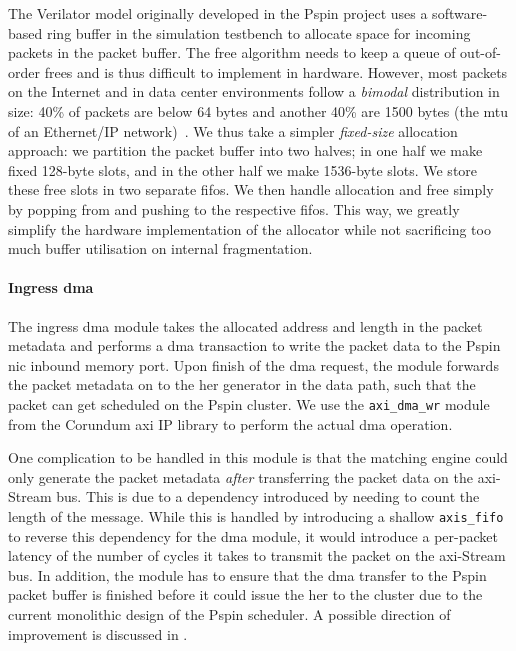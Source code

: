 The Verilator model originally developed in the P\acs{spin} project uses a software-based ring buffer in the simulation testbench to allocate space for incoming packets in the packet buffer.  The free algorithm needs to keep a queue of out-of-order frees and is thus difficult to implement in hardware.  However, most packets on the Internet and in data center environments follow a \emph{bimodal} distribution in size: 40\% of packets are below 64 bytes and another 40\% are 1500 bytes (the \ac{mtu} of an Ethernet/IP network)~\cite{john_analysis_2007,benson_understanding_2009}.  We thus take a simpler \emph{fixed-size} allocation approach: we partition the packet buffer into two halves; in one half we make fixed 128-byte slots, and in the other half we make 1536-byte slots.  We store these free slots in two separate \ac{fifo}s.  We then handle allocation and free simply by popping from and pushing to the respective \ac{fifo}s.  This way, we greatly simplify the hardware implementation of the allocator while not sacrificing too much buffer utilisation on internal fragmentation.


\paragraph{Ingress \ac{dma}} The ingress \ac{dma} module takes the allocated address and length in the packet metadata and performs a \ac{dma} transaction to write the packet data to the P\acs{spin} \ac{nic} inbound memory port.  Upon finish of the \ac{dma} request, the module forwards the packet metadata on to the \ac{her} generator in the data path, such that the packet can get scheduled on the P\acs{spin} cluster.  We use the \texttt{axi\_\-dma\_\-wr} module from the Corundum \ac{axi} IP library to perform the actual \ac{dma} operation.

One complication to be handled in this module is that the matching engine could only generate the packet metadata \emph{after} transferring the packet data on the \ac{axi}-Stream bus.  This is due to a dependency introduced by needing to count the length of the message.  While this is handled by introducing a shallow \texttt{axis\_\-fifo} to reverse this dependency for the \ac{dma} module, it would introduce a per-packet latency of the number of cycles it takes to transmit the packet on the \ac{axi}-Stream bus.  In addition, the module has to ensure that the \ac{dma} transfer to the P\acs{spin} packet buffer is finished before it could issue the \ac{her} to the cluster due to the current monolithic design of the P\acs{spin} scheduler.  A possible direction of improvement is discussed in .

